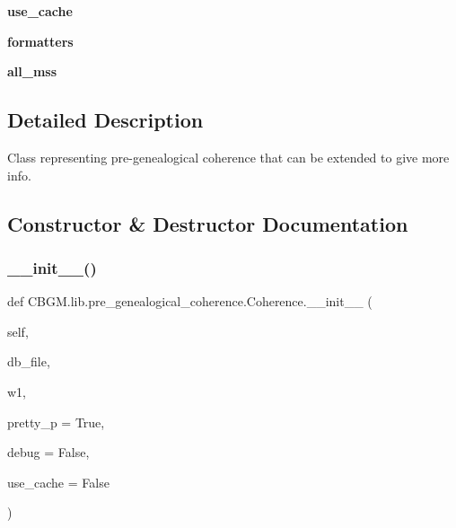 \begin{DoxyCompactItemize}
\mbox{\label{classCBGM_1_1lib_1_1pre__genealogical__coherence_1_1Coherence_a4edf96f162a45b4af585a082c7c07d64}} 
{\bfseries use\+\_\+cache}
\item 
\mbox{\label{classCBGM_1_1lib_1_1pre__genealogical__coherence_1_1Coherence_a552d93c81345c3554b6b71de9d1725bb}} 
{\bfseries formatters}
\item 
\mbox{\label{classCBGM_1_1lib_1_1pre__genealogical__coherence_1_1Coherence_ad8e23b28e8768d1ea071d4718e8bad59}} 
{\bfseries all\+\_\+mss}
\end{DoxyCompactItemize}


\subsection{Detailed Description}
\begin{DoxyVerb}Class representing pre-genealogical coherence that can be extended
to give more info.
\end{DoxyVerb}
 

\subsection{Constructor \& Destructor Documentation}
\mbox{\label{classCBGM_1_1lib_1_1pre__genealogical__coherence_1_1Coherence_ae6841155c04b8c5dcf22279b008cb96e}} 
\subsubsection{\texorpdfstring{\+\_\+\+\_\+init\+\_\+\+\_\+()}{\_\_init\_\_()}}
{\footnotesize\ttfamily def C\+B\+G\+M.\+lib.\+pre\+\_\+genealogical\+\_\+coherence.\+Coherence.\+\_\+\+\_\+init\+\_\+\+\_\+ (\begin{DoxyParamCaption}\item[{}]{self,  }\item[{}]{db\+\_\+file,  }\item[{}]{w1,  }\item[{}]{pretty\+\_\+p = {\ttfamily True},  }\item[{}]{debug = {\ttfamily False},  }\item[{}]{use\+\_\+cache = {\ttfamily False} }\end{DoxyParamCaption})}

